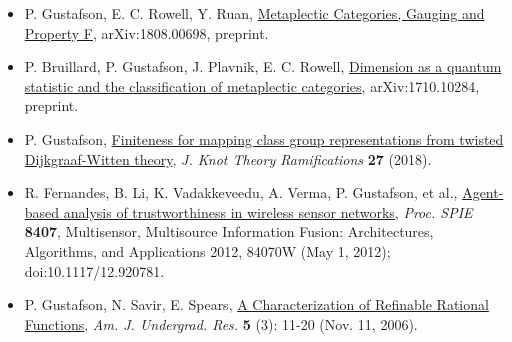   \begin{itemize}

  \item[] P. Gustafson, E. C. Rowell, Y. Ruan, \href{https://arxiv.org/abs/1808.00698}{Metaplectic Categories, Gauging and Property F}, arXiv:1808.00698, preprint.

  \item[] P. Bruillard, P. Gustafson, J. Plavnik, E. C. Rowell, \href{https://arxiv.org/abs/1710.10284}{Dimension as a quantum statistic and the classification of metaplectic categories},  arXiv:1710.10284, preprint. 
    
  \item[] P. Gustafson, \href{https://arxiv.org/abs/1610.06069}{Finiteness for mapping class group representations from twisted Dijkgraaf-Witten theory}, \emph{J. Knot Theory Ramifications} \textbf{27} (2018).

  \item[] R. Fernandes, B. Li, K. Vadakkeveedu, A. Verma, P. Gustafson, et al., \href{http://proceedings.spiedigitallibrary.org/proceeding.aspx?articleid=1354959}{Agent-based analysis of trustworthiness in wireless sensor networks}, \emph{Proc. SPIE} \textbf{8407}, Multisensor, Multisource Information Fusion: Architectures, Algorithms, and Applications 2012, 84070W (May 1, 2012); doi:10.1117/12.920781. 

 \item[] P. Gustafson, N. Savir, E. Spears, \href{http://www.uni.edu/ajur/v5n3/Gufstafson\%20et\%20al\%20new\%20pp\%2011-20.pdf}{A Characterization of Refinable Rational Functions}, \emph{Am. J. Undergrad. Res.} \textbf{5} (3): 11-20 (Nov. 11, 2006).
  
 \end{itemize}
 
